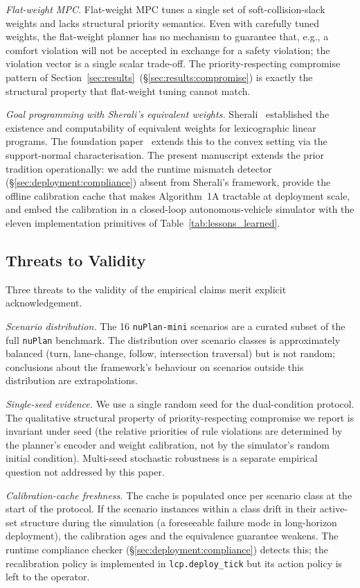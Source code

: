 \emph{Flat-weight MPC.} Flat-weight MPC tunes a single set of soft-collision-slack weights and lacks structural priority semantics. Even with carefully tuned weights, the flat-weight planner has no mechanism to guarantee that, e.g., a comfort violation will not be accepted in exchange for a safety violation; the violation vector is a single scalar trade-off. The priority-respecting compromise pattern of Section~\ref{sec:results}~(\S\ref{sec:results:compromise}) is exactly the structural property that flat-weight tuning cannot match.

\emph{Goal programming with Sherali's equivalent weights.} Sherali~\cite{sherali1982equivalent} established the existence and computability of equivalent weights for lexicographic linear programs. The foundation paper~\cite{lcp2025} extends this to the convex setting via the support-normal characterisation. The present manuscript extends the prior tradition operationally: we add the runtime mismatch detector (\S\ref{sec:deployment:compliance}) absent from Sherali's framework, provide the offline calibration cache that makes Algorithm~1A tractable at deployment scale, and embed the calibration in a closed-loop autonomous-vehicle simulator with the eleven implementation primitives of Table~\ref{tab:lessons_learned}.

\subsection{Threats to Validity}
\label{sec:discussion:validity}

Three threats to the validity of the empirical claims merit explicit acknowledgement.

\emph{Scenario distribution.} The 16 \texttt{nuPlan-mini} scenarios are a curated subset of the full \texttt{nuPlan} benchmark. The distribution over scenario classes is approximately balanced (turn, lane-change, follow, intersection traversal) but is not random; conclusions about the framework's behaviour on scenarios outside this distribution are extrapolations.

\emph{Single-seed evidence.} We use a single random seed for the dual-condition protocol. The qualitative structural property of priority-respecting compromise we report is invariant under seed (the relative priorities of rule violations are determined by the planner's encoder and weight calibration, not by the simulator's random initial condition). Multi-seed stochastic robustness is a separate empirical question not addressed by this paper.

\emph{Calibration-cache freshness.} The cache is populated once per scenario class at the start of the protocol. If the scenario instances within a class drift in their active-set structure during the simulation (a foreseeable failure mode in long-horizon deployment), the calibration ages and the equivalence guarantee weakens. The runtime compliance checker (\S\ref{sec:deployment:compliance}) detects this; the recalibration policy is implemented in \texttt{lcp.deploy\_tick} but its action policy is left to the operator.
